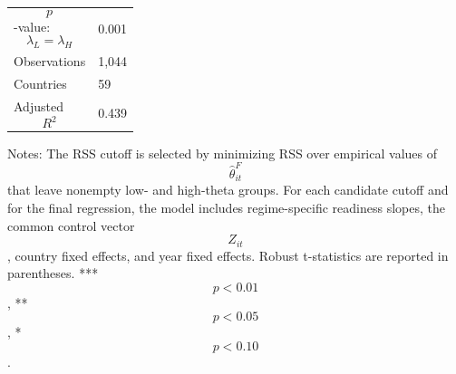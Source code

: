 \begin{table}[H]
\begin{threeparttable}
\begin{tabularx}{\textwidth}{lY}
$$p$$-value: $$\lambda_L=\lambda_H$$ & 0.001 \\
Observations & 1,044 \\
Countries & 59 \\
Adjusted $$R^2$$ & 0.439 \\
\bottomrule
\end{tabularx}
\begin{tablenotes}[flushleft]\footnotesize
\item Notes: The RSS cutoff is selected by minimizing RSS over empirical values of $$\widehat{\theta}^{F}_{it}$$ that leave nonempty low- and high-theta groups. For each candidate cutoff and for the final regression, the model includes regime-specific readiness slopes, the common control vector $$Z_{it}$$, country fixed effects, and year fixed effects. Robust t-statistics are reported in parentheses. *** $$p<0.01$$, ** $$p<0.05$$, * $$p<0.10$$.
\end{tablenotes}
\end{threeparttable}
\end{table}
